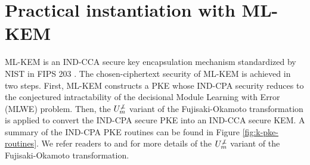 \documentclass[journal=tches,submission]{iacrtrans}
\begin{document}
\section{Practical instantiation with ML-KEM}\label{sec:practical-instantiation-with-mlkem}
ML-KEM is an IND-CCA secure key encapsulation mechanism standardized by NIST in FIPS 203 \cite{FIPS203}. The chosen-ciphertext security of ML-KEM is achieved in two steps. First, ML-KEM constructs a PKE whose IND-CPA security reduces to the conjectured intractability of the decisional Module Learning with Error (MLWE) problem. Then, the $U^{\not\bot}_m$ variant of the Fujisaki-Okamoto transformation is applied to convert the IND-CPA secure PKE into an IND-CCA secure KEM. A summary of the IND-CPA PKE routines can be found in Figure \ref{fig:k-pke-routines}. We refer readers to \cite{DBLP:conf/tcc/HofheinzHK17} and \cite{FIPS203} for more details of the $U^{\not\bot}_m$ variant of the Fujisaki-Okamoto transformation.
\end{document}
